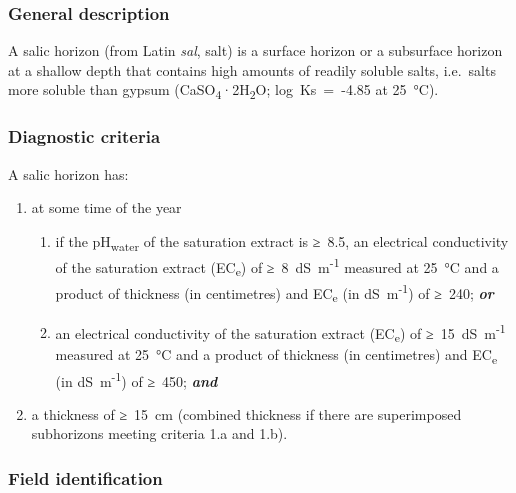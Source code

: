 \documentclass[
  letterpaper,
  DIV=11,
  numbers=noendperiod]{scrreprt}
\providecommand{\tightlist}{%
  \setlength{\itemsep}{0pt}\setlength{\parskip}{0pt}}\usepackage{longtable,booktabs,array}
\begin{document}
\hypertarget{general-description-32}{%
\subsubsection{General description}\label{general-description-32}}

A salic horizon (from Latin \emph{sal}, salt) is a surface horizon or a
subsurface horizon at a shallow depth that contains high amounts of
readily soluble salts, i.e.~salts more soluble than gypsum
(CaSO\textsubscript{4}·2H\textsubscript{2}O; log~Ks~=~-4.85 at 25~°C).

\hypertarget{diagnostic-criteria-32}{%
\subsubsection{Diagnostic criteria}\label{diagnostic-criteria-32}}

A salic horizon has:

\begin{enumerate}
\def\labelenumi{\arabic{enumi}.}
\item
  at some time of the year

  \begin{enumerate}
  \def\labelenumii{\alph{enumii}.}
  \tightlist
  \item
    if the pH\textsubscript{water} of the saturation extract is ≥~8.5,
    an electrical conductivity of the saturation extract
    (EC\textsubscript{e}) of ≥~8~dS~m\textsuperscript{-1} measured at
    25~°C and a product of thickness (in centimetres) and
    EC\textsubscript{e} (in dS~m\textsuperscript{-1}) of ≥~240;
    \textbf{\emph{or}}
  \item
    an electrical conductivity of the saturation extract
    (EC\textsubscript{e}) of ≥~15~dS~m\textsuperscript{-1} measured at
    25~°C and a product of thickness (in centimetres) and
    EC\textsubscript{e} (in dS~m\textsuperscript{-1}) of ≥~450;
    \textbf{\emph{and}}
  \end{enumerate}
\item
  a thickness of ≥~15~cm (combined thickness if there are superimposed
  subhorizons meeting criteria 1.a and 1.b).
\end{enumerate}

\hypertarget{field-identification-24}{%
\subsubsection{Field identification}\label{field-identification-24}}
\end{document}
